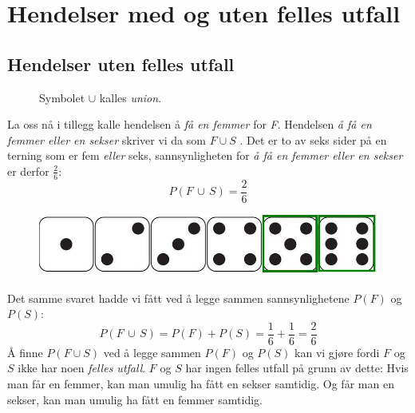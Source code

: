 \section{Hendelser med og uten felles utfall}
\subsection{Hendelser uten felles utfall}
\begin{figure}
	\begin{shaded*}
		Symbolet $ \cup $ kalles \textit{union}.
	\end{shaded*}
\end{figure}
La oss nå i tillegg kalle hendelsen å \textit{få en femmer} for \textit{F}. Hendelsen \textit{å få en femmer \textsl{eller} en sekser} skriver vi da som $ F\cup S $ . Det er to av seks sider på en terning som er fem \textsl{eller} seks, sannsynligheten for \textit{å få en femmer \textsl{eller} en sekser} er derfor $ \frac{2}{6} $:
$$P(F\,\cup\,S)=\frac{2}{6}$$ 
\begin{figure}[H]
	\centering
	\includegraphics[scale=0.3]{tern2}
\end{figure}

Det samme svaret hadde vi fått ved å legge sammen sannsynlighetene $P(F)$ og $P(S)$:
\[ P(F\,\cup\,S)=P(F)+P(S)=\frac{1}{6}+\frac{1}{6}=\frac{2}{6} \]
Å finne $ P(F\cup S) $ ved å legge sammen $ P(F) $ og $ P(S) $ kan vi gjøre fordi $ F $ og $ S $ ikke har noen \textit{felles utfall}. $ F $ og $ S $ har ingen felles utfall på grunn av dette: Hvis man får en femmer, kan man umulig ha fått en sekser samtidig. Og får man en sekser, kan man umulig ha fått en femmer samtidig.
